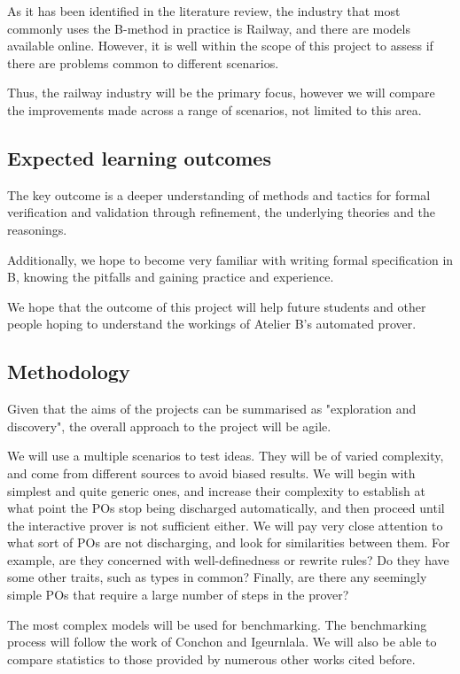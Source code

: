 \documentclass[11pt,journal]{IEEEtran}
\begin{document}
	As it has been identified in the literature review, the industry that most commonly uses the B-method in practice is Railway, and there are models available online\cite{Railway routing}. However, it is well within the scope of this project to assess if there are problems common to different scenarios.
	
	Thus, the railway industry will be the primary focus, however we will compare the improvements made across a range of scenarios, not limited to this area.
	
	\subsection{Expected learning outcomes}
	The key outcome is a deeper understanding of methods and tactics for formal verification and validation through refinement, the underlying theories and the reasonings. 
	
	Additionally, we hope to become very familiar with writing formal specification in B, knowing the pitfalls and gaining practice and experience.	
	
	We hope that the outcome of this project will help future students and other people hoping to understand the workings of Atelier B's automated prover.
		
	\subsection{Methodology}

	Given that the aims of the projects can be summarised as "exploration and discovery", the overall approach to the project will be agile. 
	
	We will use a multiple scenarios to test ideas. They will be of varied complexity, and come from different sources to avoid biased results. We will begin with simplest and quite generic ones, and increase their complexity to establish at what point the POs stop being discharged automatically, and then proceed until the interactive prover is not sufficient either. We will pay very close attention to what sort of POs are not discharging, and look for similarities between them. For example, are they concerned with well-definedness or rewrite rules? Do they have some other traits, such as types in common? Finally, are there any seemingly simple POs that require a large number of steps in the prover?
	
	The most complex models will be used for benchmarking. The benchmarking process will follow the work of Conchon and Igeurnlala\cite{survey}. We will also be able to compare statistics to those provided by numerous other works cited before.
	
\end{document}

